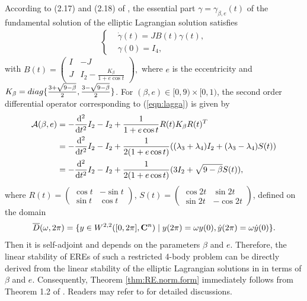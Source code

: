 \documentclass[11pt]{article}
\def\nn{\nonumber}
\def\lb{\label}
\def\d{{\mathrm{d}}}
\def\C{{\bf C}}
\def\bb{{\beta}}
\def\om{{\omega}}
\def\cA{{\cal A}}
\def\diag{{\rm diag}}
\def\ol#1{\overline{#1}}
\begin{document}
According to (2.17) and (2.18) of \cite{HLS}, the essential part $\gamma=\gamma_{\beta, e}(t)$ of the fundamental solution of the elliptic Lagrangian solution satisfies
\begin{align}
\begin{cases}
&\dot{\gamma}(t)=J B(t) \gamma(t), \\
&\gamma(0)=I_{4},
\end{cases}\lb{eqn:lagga}
\end{align}
with
$B(t)=\left(\begin{smallmatrix}
I & -J \\
J & I_2 - \frac{K_{\beta}}{1+e\cos t}
\end{smallmatrix}\right),
$
where $e$ is the eccentricity and $K_{\beta}=\diag\{\frac{3+\sqrt{9-\beta} }{2}, \frac{3-\sqrt{9-\beta}}{2}\}$.
 For $(\beta, e) \in[0,9) \times[0,1)$, the second order differential operator corresponding to (\ref{eqn:lagga}) is given by
\begin{align}\lb{eqn:ca}
  \cA(\bb, e) &= -\frac{\d^2}{\d t^2}I_2  -I_2 + \frac{1}{1+e\cos t}R(t)K_{\bb}R(t)^T \nn \\
  &= -\frac{\d^2}{\d t^2}I_2  -I_2 + \frac{1}{2(1+e\cos t)}(
  (\lambda_3 + \lambda_4)I_2 + (\lambda_3 - \lambda_4) S(t))\\
  &= -\frac{\d^2}{\d t^2}I_2  -I_2 + \frac{1}{2(1+e\cos t)}(
       3I_2 + \sqrt{9 - \beta} S(t)),  \lb{cA}
\end{align}
where $R(t) = (\begin{smallmatrix}\cos t & -\sin t\\ \sin t & \cos t \end{smallmatrix})$,
$S(t) = (\begin{smallmatrix}
\cos 2t & \sin 2t\\ \sin 2t & -\cos 2t
\end{smallmatrix})$, defined on the domain
$$
\ol{D}(\om,2\pi)=\{y\in W^{2,2}([0,2\pi],\C^n)\;
|\;y(2\pi)=\om y(0),\dot{y}(2\pi)=\om\dot{y}(0)\}.
$$ 
Then it is self-adjoint and depends on the parameters $\beta$ and $e$. 
Therefore, the linear stability of EREs of such a  restricted 4-body problem can be directly derived from the linear stability of the elliptic Lagrangian solutions in \cite{HLS} in terms of $\beta$ and $e$.
Consequently, Theorem \ref{thm:RE.norm.form}
immediately follows from Theorem 1.2 of \cite{HLS}.
Readers may refer to \cite{HLS} for detailed discussions. 

\end{document}
